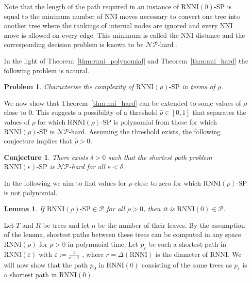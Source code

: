 \documentclass[11pt]{amsart}
\newtheorem{lemma}{Lemma}
\newtheorem{problem}{Problem}
\newtheorem{conjecture}{Conjecture}
\newcommand{\rnni}{\mathrm{RNNI}}
\newcommand{\nni}{\mathrm{NNI}}
\newcommand{\np}{\mathcal{NP}}
\newcommand{\p}{\mathcal{P}}
\newcommand{\decprob}[1]{\rnni(#1)\text{-}\mathrm{SP}}
\renewcommand{\epsilon}{\varepsilon}
\newcommand{\summary}[1]{} %
\begin{document}
\proof
Note that the length of the path required in an instance of $\decprob{0}$ is equal to the minimum number of $\nni$ moves necessary to convert one tree into another tree where the rankings of internal nodes are ignored and every $\nni$ move is allowed on every edge.
This minimum is called the $\nni$ distance and the corresponding decision problem is known to be $\np$-hard \autocite{Dasgupta2000-xa}.
\endproof

\summary{Complexity of $\decprob{\rho}$ changes somewhere between zero and one -- where remains an open question}
In the light of Theorem~\ref{thm:rnni_polynomial} and Theorem~\ref{thm:nni_hard} the following problem is natural.

\begin{problem}
Characterise the complexity of $\decprob{\rho}$ in terms of $\rho$.
\label{prblm:rho_range}
\end{problem}

\summary{Getting one step closer to answer this question by considering small neighbourhoods for $\rho$ around zero and one}
We now show that Theorem~\ref{thm:nni_hard} can be extended to some values of $\rho$ close to $0$.
This suggests a possibility of a threshold $\hat\rho \in [0, 1]$ that separates the values of $\rho$ for which $\decprob{\rho}$ is polynomial from those for which $\decprob{\rho}$ is $\np$-hard.
Assuming the threshold exists, the following conjecture implies that $\hat\rho > 0$.

\begin{conjecture}
There exists $\delta > 0$ such that the shortest path problem $\decprob{\epsilon}$ is $\np$-hard for all $\epsilon < \delta$.
\label{prop:complexity_around_nni}
\end{conjecture}

\summary{Finding one $\rho$ between $0$ and $1$ for which $\decprob{\rho} \notin \p$}
In the following we aim to find values for $\rho$ close to zero for which $\decprob{\rho}$ is not polynomial.

\begin{lemma}
    If $\decprob{\rho} \in \p$ for all $\rho > 0$, then it is $\rnni(0) \in \p$.
    \label{lemma:if_decprob_poly}
\end{lemma}

\proof
	Let $T$ and $R$ be trees and let $n$ be the number of their leaves.
    By the assumption of the lemma, shortest paths between these trees can be computed in any space $\rnni(\rho)$ for $\rho > 0$ in polynmoial time.
	Let $p_\epsilon$ be such a shortest path in $\rnni(\epsilon)$ with $\epsilon := \frac{1}{r+1}$
	\todo{$\epsilon$ or $\rho_0$? -- $\rho_0$ results in awkward indexing: $p_{\rho_0}$}
	, where $r = \Delta(\rnni)$ is the diameter of $\rnni$.
    We will now show that the path $p_0$ in $\rnni(0)$ consisting of the same trees as $p_\epsilon$ is a shortest path in $\rnni(0)$.
\end{document}
